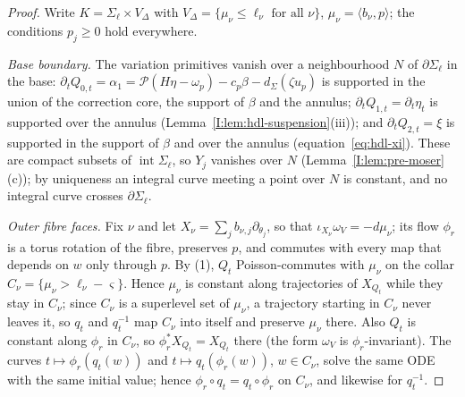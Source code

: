 \begin{proof}
Write $K=\Sigma_\ell\times V_\Delta$ with $V_\Delta=\{\mu_\nu\le\ell_\nu\text{ for all }\nu\}$, $\mu_\nu=\langle b_\nu,p\rangle$;
the conditions $p_j\ge0$ hold everywhere.

\emph{Base boundary.} The variation primitives vanish over a neighbourhood $N$ of $\partial\Sigma_\ell$ in the base:
$\partial_tQ_{0,t}=\alpha_1=\mathcal P(H\eta-\omega_p)-c_p\beta-d_\Sigma(\zeta u_p)$ is supported in the union of the correction
core, the support of $\beta$ and the annulus; $\partial_tQ_{1,t}=\partial_t\eta_t$ is supported over the annulus
(Lemma~\ref{I:lem:hdl-suspension}(iii)); and $\partial_tQ_{2,t}=\xi$ is supported in the support of $\beta$ and over the annulus
(equation~\ref{eq:hdl-xi}). These are compact subsets of $\operatorname{int}\Sigma_\ell$, so $Y_j$ vanishes over $N$
(Lemma~\ref{I:lem:pre-moser}(c)); by uniqueness an integral curve meeting a point over $N$ is constant, and no integral curve
crosses $\partial\Sigma_\ell$.

\emph{Outer fibre faces.} Fix $\nu$ and let $X_\nu=\sum_jb_{\nu,j}\partial_{\theta_j}$, so that $\iota_{X_\nu}\omega_V=-d\mu_\nu$;
its flow $\phi_r$ is a torus rotation of the fibre, preserves $p$, and commutes with every map that depends on $w$ only through $p$.
By (1), $Q_t$ Poisson-commutes with $\mu_\nu$ on the collar
$C_\nu=\{\mu_\nu>\ell_\nu-\varsigma\}$. Hence $\mu_\nu$ is constant along trajectories of $X_{Q_t}$ while they stay in $C_\nu$;
since $C_\nu$ is a superlevel set of $\mu_\nu$, a trajectory starting in $C_\nu$ never leaves it, so $q_t$ and $q_t^{-1}$ map
$C_\nu$ into itself and preserve $\mu_\nu$ there. Also $Q_t$ is constant along $\phi_r$ in $C_\nu$, so $\phi_r^*X_{Q_t}=X_{Q_t}$
there (the form $\omega_V$ is $\phi_r$-invariant). The curves $t\mapsto\phi_r(q_t(w))$ and $t\mapsto q_t(\phi_r(w))$, $w\in C_\nu$,
solve the same ODE with the same initial value; hence $\phi_r\circ q_t=q_t\circ\phi_r$ on $C_\nu$, and likewise for $q_t^{-1}$.


\end{proof}
